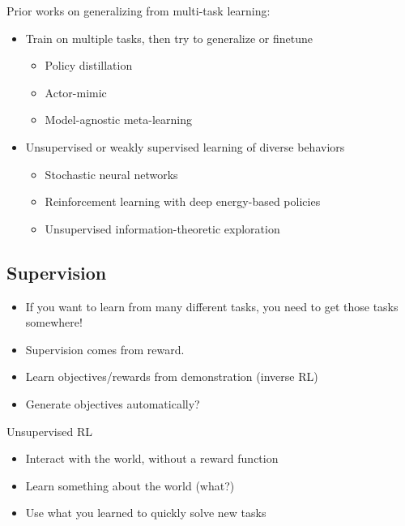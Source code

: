 Prior works on generalizing from multi-task learning:
\begin{itemize}
	\item Train on multiple tasks, then try to generalize or finetune
	\begin{itemize}
		\item Policy distillation \cite{rusu2015policy}
		\item Actor-mimic \cite{parisotto2015actor}
		\item Model-agnostic meta-learning \cite{finn2017model}
	\end{itemize}
	\item Unsupervised or weakly supervised learning of diverse behaviors
	\begin{itemize}
		\item Stochastic neural networks \cite{florensa2017stochastic}
		\item Reinforcement learning with deep energy-based policies \cite{haarnoja2017reinforcement}
		\item Unsupervised information-theoretic exploration
	\end{itemize}
\end{itemize}

\subsection{Supervision}
\begin{itemize}
	\item If you want to learn from many different tasks, you need to get those tasks somewhere!
	\item Supervision comes from reward.
	\item Learn objectives/rewards from demonstration (inverse \ac{RL})
	\item Generate objectives automatically?
\end{itemize}

Unsupervised \ac{RL}
\begin{itemize}
	\item Interact with the world, without a reward function
	\item Learn something about the world (what?)
	\item Use what you learned to quickly solve new tasks
\end{itemize}